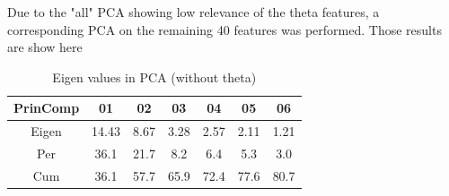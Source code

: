 \begin{table}[h!]
	\centering
	\caption{Eigen values in PCA (without theta)}
	{\small Due to the "all" PCA showing low relevance of the theta features, a corresponding PCA on the remaining 40 features was performed. Those results are show here}
	\bigskip
	\label{tab:eigen-values-without-theta}
	\begin{tabular}{|c|c|c|c|c|c|c|}
		\hline
		\textbf{PrinComp} & \textbf{01} & \textbf{02} & \textbf{03} & \textbf{04} & \textbf{05} & \textbf{06} \\
		\hline
		Eigen & 14.43 & 8.67 & 3.28 & 2.57 & 2.11 & 1.21 \\
		Per & 36.1 & 21.7 & 8.2 & 6.4 & 5.3 & 3.0 \\
		Cum & 36.1 & 57.7 & 65.9 & 72.4 & 77.6 & 80.7 \\
		\hline
	\end{tabular}
\end{table}
\fi

